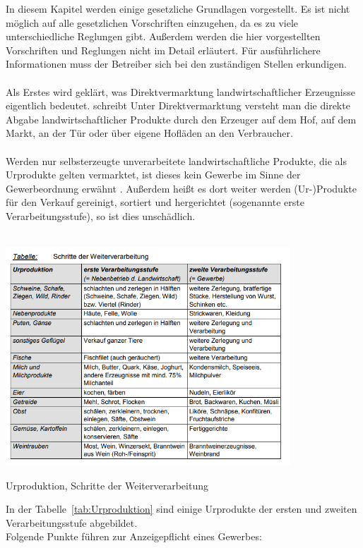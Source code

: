 In diesem Kapitel werden einige gesetzliche Grundlagen vorgestellt. 
Es ist nicht möglich auf alle gesetzlichen Vorschriften einzugehen, da es zu viele unterschiedliche Reglungen gibt.
Außerdem werden die hier vorgestellten Vorschriften und Reglungen nicht im Detail erläutert. Für ausführlichere Informationen muss der Betreiber sich bei den zuständigen Stellen erkundigen. 
\\
\\
Als Erstes wird geklärt, was Direktvermarktung landwirtschaftlicher Erzeugnisse eigentlich bedeutet. \cite{gesetze1} schreibt \glqq Unter Direktvermarktung
versteht man die direkte Abgabe landwirtschaftlicher Produkte durch den Erzeuger auf dem Hof, auf dem Markt, an der Tür oder über eigene Hofläden an den Verbraucher.\grqq{} 
\\
\\
Werden nur \glqq selbsterzeugte unverarbeitete landwirtschaftliche Produkte, die als Urprodukte gelten vermarktet\grqq{}, ist dieses \glqq kein Gewerbe im Sinne der Gewerbeordnung\grqq{} erwähnt \cite{gesetze4}. Außerdem heißt es dort weiter \glqq werden (Ur-)Produkte für den Verkauf gereinigt, sortiert und hergerichtet (sogenannte erste Verarbeitungsstufe), so ist dies unschädlich.\grqq{}
\\
\\
\begin{table}[h]
	\centering
	\includegraphics[width=0.8\textwidth,angle=0]{abb/urproduktion}
	\caption[Urproduktion, Schritte der Weiterverarbeitung]{Urproduktion, \glqq Schritte der Weiterverarbeitung\grqq{} \cite{gesetze2}}
	\label{tab:Urproduktion}
\end{table}


In der Tabelle~\ref{tab:Urproduktion} sind einige Urprodukte der ersten und zweiten Verarbeitungsstufe abgebildet. 
\\
Folgende Punkte führen zur Anzeigepflicht eines Gewerbes:\cite{gesetze2}


